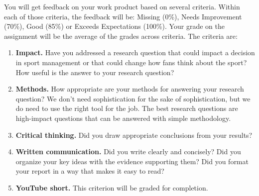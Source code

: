 \documentclass{article}
\begin{document}
      You will get feedback on your work product based on several criteria. Within each of those criteria, the feedback will be: Missing (0\%), Needs Improvement (70\%), Good (85\%) or Exceeds Expectations (100\%). Your grade on the assignment will be the average of the grades across criteria. The criteria are:
      \begin{enumerate}
        \item {\bf Impact.} Have you addressed a research question that could impact a decision in sport management or that could change how fans think about the sport? How useful is the answer to your research question?
        \item {\bf Methods.} How appropriate are your methods for answering your research question? We don't need sophistication for the sake of sophistication, but we do need to use the right tool for the job. The best research questions are high-impact questions that can be answered with simple methodology.
        \item {\bf Critical thinking.} Did you draw appropriate conclusions from your results?
        \item {\bf Written communication.} Did you write clearly and concisely? Did you organize your key ideas with the evidence supporting them? Did you format your report in a way that makes it easy to read?
        \item {\bf YouTube short.} This criterion will be graded for completion.
      \end{enumerate}
\end{document}
